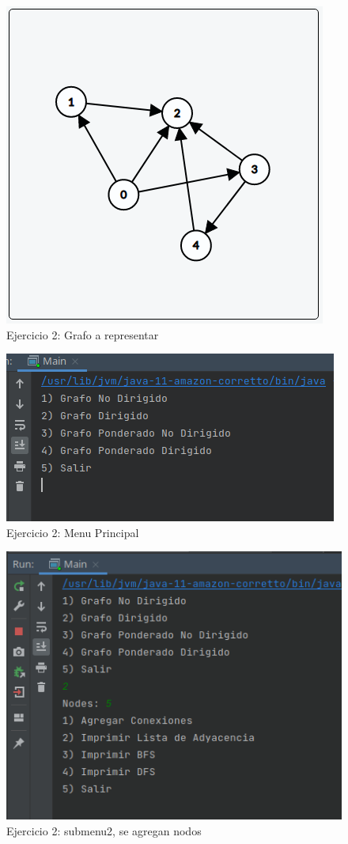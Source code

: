 \documentclass{article}
\begin{document}
			\begin{figure}[H]
				\centering
				\includegraphics[scale= 0.6]{images/e2graph.png}
				\caption*{Ejercicio 2: Grafo a representar}
			\end{figure}
			
			\begin{figure}[H]
				\centering
				\includegraphics[scale= 0.9]{images/e21.png}
				\caption*{Ejercicio 2: Menu Principal}
			\end{figure}
			
			\begin{figure}[H]
				\centering
				\includegraphics[scale= 0.9]{images/e22.png}
				\caption*{Ejercicio 2: submenu2, se agregan nodos}
			\end{figure}
			
\end{document}
